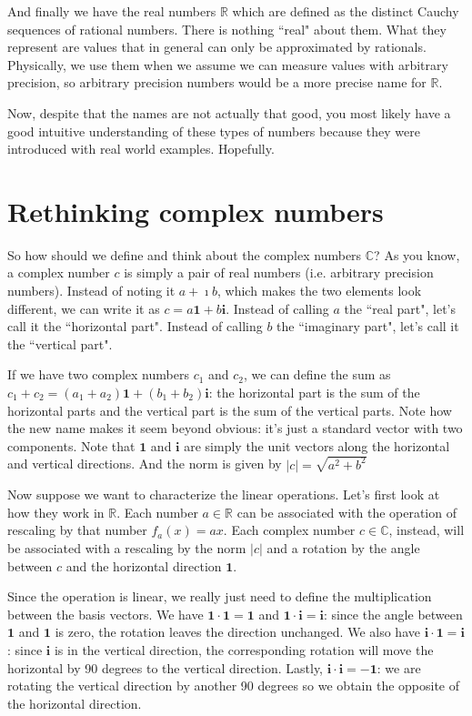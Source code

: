 \documentclass[aps,pra,10pt,floatfix,nofootinbib]{revtex4-1}
\theoremstyle{definition}
\begin{document}
And finally we have the real numbers $\mathbb{R}$ which are defined as the distinct Cauchy sequences of rational numbers. There is nothing ``real" about them. What they represent are values that in general can only be approximated by rationals. Physically, we use them when we assume we can measure values with arbitrary precision, so arbitrary precision numbers would be a more precise name for $\mathbb{R}$.

Now, despite that the names are not actually that good, you most likely have a good intuitive understanding of these types of numbers because they were introduced with real world examples. Hopefully.

\section{Rethinking complex numbers}

So how should we define and think about the complex numbers $\mathbb{C}$? As you know, a complex number $c$ is simply a pair of real numbers (i.e. arbitrary precision numbers). Instead of noting it $a+\imath b$, which makes the two elements look different, we can write it as $c = a\mathbf{1} + b \mathbf{i}$. Instead of calling $a$ the ``real part", let's call it the ``horizontal part". Instead of calling $b$ the ``imaginary part", let's call it the ``vertical part".

If we have two complex numbers $c_1$ and $c_2$, we can define the sum as $c_1+c_2 = (a_1+a_2) \mathbf{1} + (b_1+b_2)\mathbf{i}$: the horizontal part is the sum of the horizontal parts and the vertical part is the sum of the vertical parts. Note how the new name makes it seem beyond obvious: it's just a standard vector with two components. Note that $\mathbf{1}$ and $\mathbf{i}$ are simply the unit vectors along the horizontal and vertical directions. And the norm is given by $|c| = \sqrt{a^2 + b^2}$

Now suppose we want to characterize the linear operations. Let's first look at how they work in $\mathbb{R}$. Each number $a \in \mathbb{R}$ can be associated with the operation of rescaling by that number $f_a(x) = a x$. Each complex number $c \in \mathbb{C}$, instead, will be associated with a rescaling by the norm $|c|$ and a rotation by the angle between $c$ and the horizontal direction $\mathbf{1}$.

Since the operation is linear, we really just need to define the multiplication between the basis vectors. We have $\mathbf{1} \cdot \mathbf{1} = \mathbf{1}$ and $\mathbf{1} \cdot \mathbf{i} = \mathbf{i}$: since the angle between $\mathbf{1}$ and $\mathbf{1}$ is zero, the rotation leaves the direction unchanged. We also have $\mathbf{i} \cdot \mathbf{1} = \mathbf{i}$: since $\mathbf{i}$ is in the vertical direction, the corresponding rotation will move the horizontal by 90 degrees to the vertical direction. Lastly, $\mathbf{i} \cdot \mathbf{i} = - \mathbf{1}$: we are rotating the vertical direction by another 90 degrees so we obtain the opposite of the horizontal direction.
\end{document}

